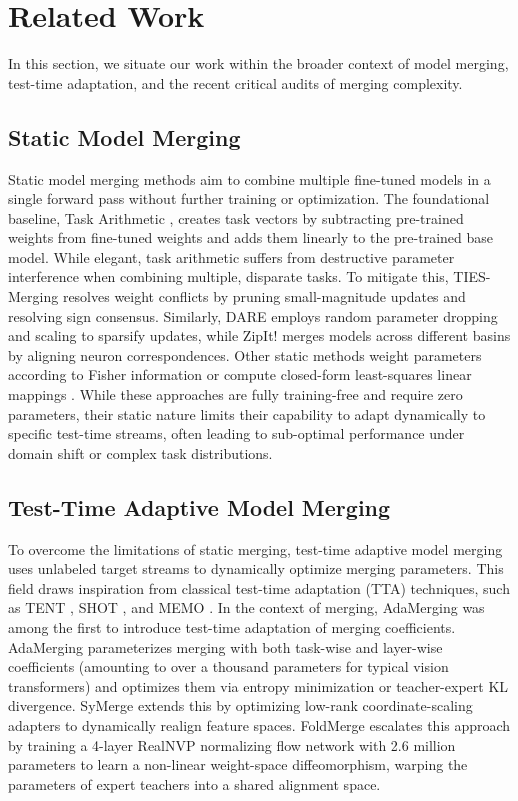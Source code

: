 \section{Related Work}
\label{sec:related_work}

In this section, we situate our work within the broader context of model merging, test-time adaptation, and the recent critical audits of merging complexity.

\subsection{Static Model Merging}
Static model merging methods aim to combine multiple fine-tuned models in a single forward pass without further training or optimization. The foundational baseline, Task Arithmetic \cite{ilharco2022editing}, creates task vectors by subtracting pre-trained weights from fine-tuned weights and adds them linearly to the pre-trained base model. While elegant, task arithmetic suffers from destructive parameter interference when combining multiple, disparate tasks. To mitigate this, TIES-Merging \cite{yadav2023ties} resolves weight conflicts by pruning small-magnitude updates and resolving sign consensus. Similarly, DARE \cite{yu2023dare} employs random parameter dropping and scaling to sparsify updates, while ZipIt! \cite{stoica2023zip} merges models across different basins by aligning neuron correspondences. Other static methods weight parameters according to Fisher information \cite{matena2021merging} or compute closed-form least-squares linear mappings \cite{choshen2022fusing}. While these approaches are fully training-free and require zero parameters, their static nature limits their capability to adapt dynamically to specific test-time streams, often leading to sub-optimal performance under domain shift or complex task distributions.

\subsection{Test-Time Adaptive Model Merging}
To overcome the limitations of static merging, test-time adaptive model merging uses unlabeled target streams to dynamically optimize merging parameters. This field draws inspiration from classical test-time adaptation (TTA) techniques, such as TENT \cite{wang2020tent}, SHOT \cite{liang2020shot}, and MEMO \cite{zhang2022memo}. In the context of merging, AdaMerging \cite{yang2024adamerging} was among the first to introduce test-time adaptation of merging coefficients. AdaMerging parameterizes merging with both task-wise and layer-wise coefficients (amounting to over a thousand parameters for typical vision transformers) and optimizes them via entropy minimization or teacher-expert KL divergence. SyMerge \cite{jung2025symerge} extends this by optimizing low-rank coordinate-scaling adapters to dynamically realign feature spaces. FoldMerge \cite{foldmerge} escalates this approach by training a 4-layer RealNVP normalizing flow network with 2.6 million parameters to learn a non-linear weight-space diffeomorphism, warping the parameters of expert teachers into a shared alignment space.

